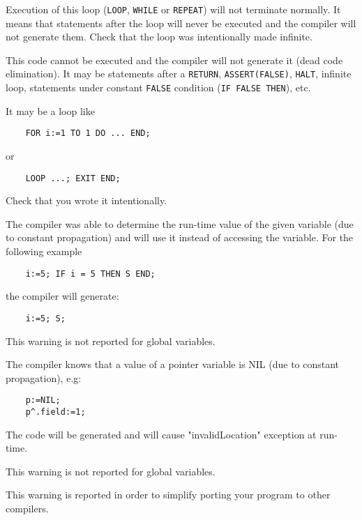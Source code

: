 
Execution of this loop (\verb'LOOP', \verb'WHILE' or \verb'REPEAT')
will not terminate normally.
It means that statements after the loop will never be executed and the
compiler will not generate them. Check that the loop was intentionally
made infinite.


This code cannot be executed and the compiler will not generate it
(dead code elimination). It may be statements after a \verb'RETURN',
\verb'ASSERT(FALSE)', \verb'HALT', infinite loop, statements under
constant \verb'FALSE' condition (\verb'IF FALSE THEN'), etc.


It may be a loop like

\verb'    FOR i:=1 TO 1 DO ... END;'

or

\verb'    LOOP ...; EXIT END;'

Check that you wrote it intentionally.


The compiler was able to determine the run-time value of the given variable
(due to constant propagation) and will use it instead of accessing the variable.
For the following example

\verb'    i:=5; IF i = 5 THEN S END;'

the compiler will generate:

\verb'    i:=5; S;'

This warning is not reported for global variables.


The compiler knows that a value of a pointer variable is NIL (due to
constant propagation), e.g:

\verb'    p:=NIL;'\\
\verb'    p^.field:=1;'

The code will be generated and will cause "invalidLocation" exception at
run-time.

This warning is not reported for global variables.


This warning is reported in order to simplify porting your program
to other \mt{} compilers.

